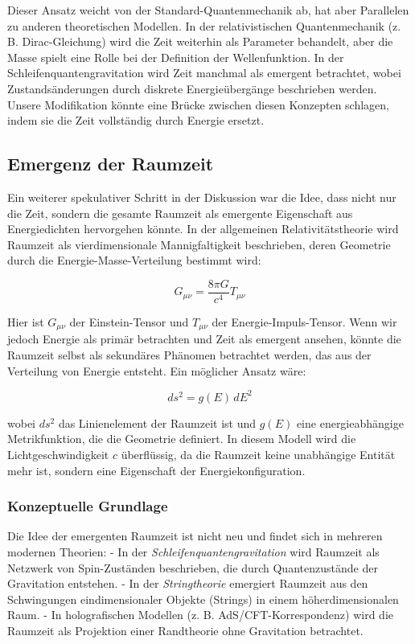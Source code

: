 \documentclass{article}
\begin{document}
	Dieser Ansatz weicht von der Standard-Quantenmechanik ab, hat aber Parallelen zu anderen theoretischen Modellen. In der relativistischen Quantenmechanik (z. B. Dirac-Gleichung) wird die Zeit weiterhin als Parameter behandelt, aber die Masse spielt eine Rolle bei der Definition der Wellenfunktion. In der Schleifenquantengravitation wird Zeit manchmal als emergent betrachtet, wobei Zustandsänderungen durch diskrete Energieübergänge beschrieben werden. Unsere Modifikation könnte eine Brücke zwischen diesen Konzepten schlagen, indem sie die Zeit vollständig durch Energie ersetzt.
	
	\subsection{Emergenz der Raumzeit}
	
	Ein weiterer spekulativer Schritt in der Diskussion war die Idee, dass nicht nur die Zeit, sondern die gesamte Raumzeit als emergente Eigenschaft aus Energiedichten hervorgehen könnte. In der allgemeinen Relativitätstheorie wird Raumzeit als vierdimensionale Mannigfaltigkeit beschrieben, deren Geometrie durch die Energie-Masse-Verteilung bestimmt wird:
	
	\[
	G_{\mu\nu} = \frac{8\pi G}{c^4} T_{\mu\nu}
	\]
	
	Hier ist \( G_{\mu\nu} \) der Einstein-Tensor und \( T_{\mu\nu} \) der Energie-Impuls-Tensor. Wenn wir jedoch Energie als primär betrachten und Zeit als emergent ansehen, könnte die Raumzeit selbst als sekundäres Phänomen betrachtet werden, das aus der Verteilung von Energie entsteht. Ein möglicher Ansatz wäre:
	
	\[
	ds^2 = g(E) \, dE^2
	\]
	
	wobei \( ds^2 \) das Linienelement der Raumzeit ist und \( g(E) \) eine energieabhängige Metrikfunktion, die die Geometrie definiert. In diesem Modell wird die Lichtgeschwindigkeit \( c \) überflüssig, da die Raumzeit keine unabhängige Entität mehr ist, sondern eine Eigenschaft der Energiekonfiguration.
	
	\subsubsection{Konzeptuelle Grundlage}
	
	Die Idee der emergenten Raumzeit ist nicht neu und findet sich in mehreren modernen Theorien:
	- In der \textit{Schleifenquantengravitation} wird Raumzeit als Netzwerk von Spin-Zuständen beschrieben, die durch Quantenzustände der Gravitation entstehen.
	- In der \textit{Stringtheorie} emergiert Raumzeit aus den Schwingungen eindimensionaler Objekte (Strings) in einem höherdimensionalen Raum.
	- In holografischen Modellen (z. B. AdS/CFT-Korrespondenz) wird die Raumzeit als Projektion einer Randtheorie ohne Gravitation betrachtet.
	
\end{document}
